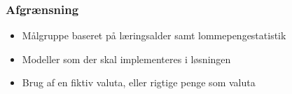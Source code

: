 
\begin{frame}
\frametitle{Afgrænsning}
    \begin{itemize}
        \item{Målgruppe baseret på læringsalder samt lommepengestatistik}
        \item{Modeller som der skal implementeres i løsningen}
        \item{Brug af en fiktiv valuta, eller rigtige penge som valuta}
    \end{itemize}
\end{frame}
    

